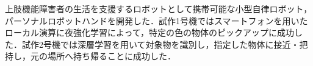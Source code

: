 上肢機能障害者の生活を支援するロボットとして携帯可能な小型自律ロボット，パーソナルロボットハンドを開発した．試作1号機ではスマートフォンを用いたローカル演算に夜強化学習によって，特定の色の物体のピックアップに成功した．試作2号機では深層学習を用いて対象物を識別し，指定した物体に接近・把持し，元の場所へ持ち帰ることに成功した．


